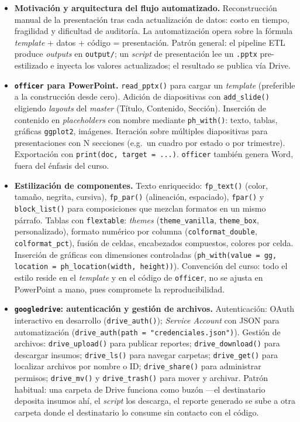 \documentclass[11pt,letterpaper]{article}
\begin{document}
\begin{itemize}[leftmargin=*, itemsep=2pt]
    \item \textbf{Motivación y arquitectura del flujo automatizado.} Reconstrucción manual de la presentación tras cada actualización de datos: costo en tiempo, fragilidad y dificultad de auditoría. La automatización opera sobre la fórmula \textit{template} + datos + código = presentación. Patrón general: el pipeline ETL produce \textit{outputs} en \texttt{output/}; un \textit{script} de presentación lee un \texttt{.pptx} pre-estilizado e inyecta los valores actualizados; el resultado se publica vía Drive.
    \item \textbf{\texttt{officer} para PowerPoint.} \texttt{read\_pptx()} para cargar un \textit{template} (preferible a la construcción desde cero). Adición de diapositivas con \texttt{add\_slide()} eligiendo \textit{layouts} del \textit{master} (Título, Contenido, Sección). Inserción de contenido en \textit{placeholders} con nombre mediante \texttt{ph\_with()}: texto, tablas, gráficas \texttt{ggplot2}, imágenes. Iteración sobre múltiples diapositivas para presentaciones con N secciones (e.g.\ un cuadro por estado o por trimestre). Exportación con \texttt{print(doc, target = ...)}. \texttt{officer} también genera Word, fuera del énfasis del curso.
    \item \textbf{Estilización de componentes.} Texto enriquecido: \texttt{fp\_text()} (color, tamaño, negrita, cursiva), \texttt{fp\_par()} (alineación, espaciado), \texttt{fpar()} y \texttt{block\_list()} para composiciones que mezclan formatos en un mismo párrafo. Tablas con \texttt{flextable}: \textit{themes} (\texttt{theme\_vanilla}, \texttt{theme\_box}, personalizado), formato numérico por columna (\texttt{colformat\_double}, \texttt{colformat\_pct}), fusión de celdas, encabezados compuestos, colores por celda. Inserción de gráficas con dimensiones controladas (\texttt{ph\_with(value = gg, location = ph\_location(width, height))}). Convención del curso: todo el estilo reside en el \textit{template} y en el código de \texttt{officer}, no se ajusta en PowerPoint a mano, pues compromete la reproducibilidad.
    \item \textbf{\texttt{googledrive}: autenticación y gestión de archivos.} Autenticación: OAuth interactivo en desarrollo (\texttt{drive\_auth()}); \textit{Service Account} con JSON para automatización (\texttt{drive\_auth(path = "credenciales.json")}). Gestión de archivos: \texttt{drive\_upload()} para publicar reportes; \texttt{drive\_download()} para descargar insumos; \texttt{drive\_ls()} para navegar carpetas; \texttt{drive\_get()} para localizar archivos por nombre o ID; \texttt{drive\_share()} para administrar permisos; \texttt{drive\_mv()} y \texttt{drive\_trash()} para mover y archivar. Patrón habitual: una carpeta de Drive funciona como buzón ---el destinatario deposita insumos ahí, el \textit{script} los descarga, el reporte generado se sube a otra carpeta donde el destinatario lo consume sin contacto con el código.

\end{itemize}
\end{document}
